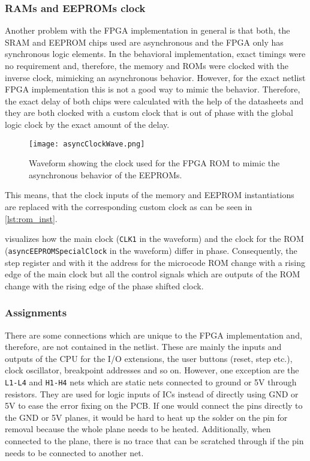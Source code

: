 \subsubsection{\glspl{RAM} and \glspl{EEPROM} clock}
Another problem with the \gls{FPGA} implementation in general is that both, the \gls{SRAM} and \gls{EEPROM} chips used are asynchronous and the \gls{FPGA} only has synchronous logic elements.
In the behavioral implementation, exact timings were no requirement and, therefore, the memory and \glspl{ROM} were clocked with the inverse clock, mimicking an asynchronous behavior.
However, for the exact netlist \gls{FPGA} implementation this is not a good way to mimic the behavior.
Therefore, the exact delay of both chips were calculated with the help of the datasheets and they are both clocked with a custom clock that is out of phase with the global logic clock by the exact amount of the delay.
\begin{figure}
  \centering
  \texttt{[image: asyncClockWave.png]}
  \caption{Waveform showing the clock used for the \gls{FPGA} \gls{ROM} to mimic the asynchronous behavior of the \glspl{EEPROM}.}
  \label{fig:asyncClockWave}
\end{figure}

This means, that the clock inputs of the memory and \gls{EEPROM} instantiations are replaced with the corresponding custom clock as can be seen in \cref{lst:rom_inst}.

 visualizes how the main clock (\texttt{CLK1} in the waveform) and the clock for the \gls{ROM} (\texttt{asyncEEPROMSpecialClock} in the waveform) differ in phase.
Consequently, the step register and with it the address for the microcode \gls{ROM} change with a rising edge of the main clock but all the control signals which are outputs of the \gls{ROM} change with the rising edge of the phase shifted clock.

\subsubsection{Assignments}
There are some connections which are unique to the \gls{FPGA} implementation and, therefore, are not contained in the netlist.
These are mainly the inputs and outputs of the \gls{CPU} for the I/O extensions, the user buttons (reset, step etc.), clock oscillator, breakpoint addresses and so on.
However, one exception are the \texttt{L1-L4} and \texttt{H1-H4} nets which are static nets connected to ground or 5V through resistors.
They are used for logic inputs of \glspl{IC} instead of directly using GND or 5V to ease the error fixing on the \gls{PCB}.
If one would connect the pins directly to the GND or 5V planes, it would be hard to heat up the solder on the pin for removal because the whole plane needs to be heated.
Additionally, when connected to the plane, there is no trace that can be scratched through if the pin needs to be connected to another net.


